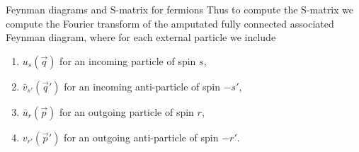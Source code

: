 \begin{mybox}{Feynman diagrams and S-matrix for fermions}
	Thus to compute the S-matrix we compute the Fourier transform of the amputated fully connected associated Feynman diagram, where for each external particle we include 
	\begin{enumerate}
		\item $u_s(\vec{q})$ for an incoming particle of spin $s$,
		\item $\bar{v}_{s'}(\vec{q}')$ for an incoming anti-particle of spin $-s'$,
		\item $\bar{u}_r(\vec{p})$ for an outgoing particle of spin $r$,
		\item $v_{r'}(\vec{p}')$ for an outgoing anti-particle of spin $-r'$.
	\end{enumerate}
\end{mybox}









\newpage 
